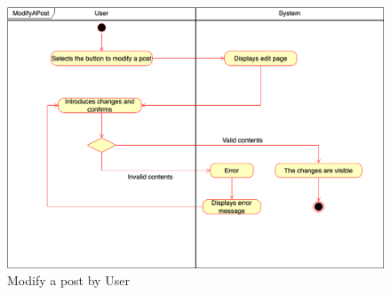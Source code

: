     \begin{figure}[h!]
        \centering
        \includegraphics[scale=0.35]{images/use_cases_diagram/user_modify_post.png}
        \caption{Modify a post by User}
        \label{fig:user_modify_post}
    \end{figure}
    \FloatBarrier
    
